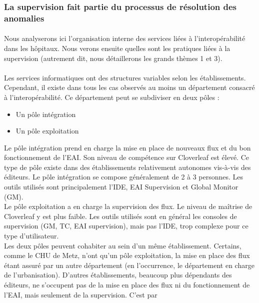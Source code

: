 		\subsubsection{La supervision fait partie du processus de résolution des
		anomalies}
			\paragraph{}%
			Nous analyserons ici l'organisation interne des services liées à
			l'interopérabilité dans les hôpitaux. Nous verons ensuite quelles sont les
			pratiques liées à la supervision (autrement dit, nous détaillerons les
			grands thèmes 1 et 3).
			
			\paragraph{}%
			Les services informatiques ont des structures variables selon les
			établissements. Cependant, il existe dans tous les cas observés au moins un
			département consacré à l’interopérabilité. Ce département peut se subdiviser
			en deux pôles :
			\begin{itemize}
			  \item Un pôle intégration
			  \item Un pôle exploitation
			\end{itemize}
			Le pôle intégration prend en charge la mise en place de nouveaux flux et du
			bon fonctionnement de l’EAI. Son niveau de compétence sur Cloverleaf est
			élevé. Ce type de pôle existe dans des établissements relativement autonomes
			vis-à-vis des éditeurs. Le pôle intégration se compose généralement de 2 à 3
			personnes. Les outils utilisés sont principalement l’IDE, EAI Supervision et
			Global Monitor (GM).\\
			Le pôle exploitation a en charge la supervision des flux. Le niveau de
			maîtrise de Cloverleaf y est plus faible. Les outils utilisés sont en
			général les consoles de supervision (GM, TC, EAI supervision), mais pas
			l’IDE, trop complexe pour ce type d’utilisateur.\\
			Les deux pôles peuvent cohabiter au sein d’un même établissement. Certains,
			comme le CHU de Metz, n’ont qu’un pôle exploitation, la mise en place des
			flux étant assuré par un autre département (en l’occurrence, le département
			en charge de l’urbanisation). D’autres établissements, beaucoup plus
			dépendants des éditeurs, ne s’occupent pas de la mise en place des flux ni
			du fonctionnement de l’EAI, mais seulement de la supervision. C’est par
